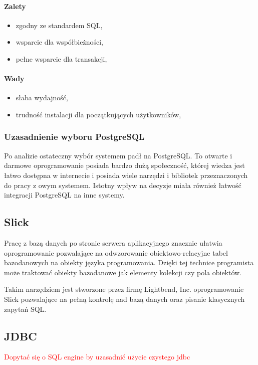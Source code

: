 \documentclass[a4paper,12pt,twoside]{article}
\begin{document}
\paragraph{Zalety}
\begin{itemize}
\item{zgodny ze standardem SQL},
\item{wsparcie dla współbieżności},
\item{pełne wsparcie dla transakcji},
\end{itemize}
\paragraph{Wady}
\begin{itemize}
\item{słaba wydajność},
\item{trudność instalacji dla początkujących użytkowników},
\end{itemize}

\subsubsection{Uzasadnienie wyboru PostgreSQL}
Po analizie ostateczny wybór systemem padł na PostgreSQL.
To otwarte i darmowe oprogramowanie posiada bardzo dużą społeczność, której wiedza jest łatwo dostępna w internecie 
i posiada wiele narzędzi i bibliotek przeznaczonych do pracy z owym systemem. 
Istotny wpływ na decyzje miała również łatwość integracji PostgreSQL na inne systemy.  

\subsection{Slick}  
Pracę z bazą danych po stronie serwera aplikacyjnego 
znacznie ułatwia oprogramowanie pozwalające na odwzorowanie obiektowo-relacyjne tabel bazodanowych na obiekty języka programowania.
Dzięki tej technice programista może traktować obiekty bazodanowe jak elementy kolekcji czy pola obiektów.

Takim narzędziem jest stworzone przez firmę Lightbend, Inc. 
oprogramowanie Slick\cite{slick} pozwalające na pełną kontrolę nad bazą danych oraz pisanie klasycznych zapytań SQL.

\subsection{JDBC}  
\textcolor{red}{Dopytać się o SQL engine by uzasadnić użycie czystego jdbc}
\end{document}
